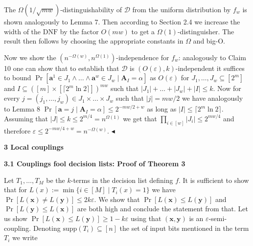 The $\Omega(1/\sqrt{mw})$-distinguishability of $\mathcal{D}$ from the uniform distribution by $f_{w}$ is
shown analogously to Lemma 7. Then according to Section 2.4
we increase the width of the $\mathrm{DNF}$ by the factor $O(mw)$ to get a $\Omega(1)$-distinguisher. The
result then follows by choosing the appropriate constants in $\Omega$ and big-O.\par




Now we show the $(n^{-\Omega(w)},n^{\Omega(1)})$-independence for $f_{w}$: analogously to
Claim 10 one can show that to establish that $\mathcal{D}$ is $(O(\varepsilon),k)$-independent it suffices to bound $\Pr[\bm{a}^{1}\in J_{1}\land\dots\land\bm{a}^{w}\in J_{w}\mid\bm{A}_{I}=\alpha]$ as $O(\varepsilon)$ for $J_{1},\dots,J_{w}\subseteq[2^{m}]$ and $I\subseteq([m]\times[\lceil 2^{m}\ln 2\rceil])^{mw}$ such that $|J_{1}|+\dots+|J_{w}|+|I|\leq k$. Now for every $j=(j_{1},\dots,j_{w})\in J_{1}\times\dots\times J_{w}$ such that $|j|=mw/2$ we have analogously to
Lemma 8 $\Pr[\bm{a}=j\mid\bm{A}_{I}=\alpha]\leq 2^{-mw/2+w}$ as long as $|I|\leq\lceil 2^{m}\ln 2\rceil$. Assuming that $|J|\leq k\leq 2^{m/4}=n^{\Omega(1)}$ we get that $\prod_{i\in[w]}|J_{i}|\leq 2^{mw/4}$ and therefore $\varepsilon\leq 2^{-mw/4+w}=n^{-\Omega(w)}$.
$\blacktriangleleft$\par







\par\medskip\noindent\textbf{
3 Local couplings}\par




\par\medskip\noindent\textbf{
3.1 Couplings fool decision lists: Proof of Theorem 3
}\par




Let $T_{1},\dots,T_{M}$ be the $k$-terms in the decision list defining $f$. It is sufficient to show that for $L(x):=\min\{i\in[M]\mid T_{i}(x)=1\}$ we have $\Pr[L(\bm{x})\neq L(\bm{y})]\leq 2k\varepsilon$.
We show that $\Pr[L(\bm{x})\leq L(\bm{y})]$ and $\Pr[L(\bm{y})\leq L(\bm{x})]$ are both high and conclude the statement from that. Let us show $\Pr[L(\bm{x})\leq L(\bm{y})]\geq 1-k\varepsilon$ using that $(\bm{x},\bm{y})$ is an $\varepsilon$-semi-coupling. Denoting $\mathrm{supp}(T_{i})\subseteq[n]$ the set of input bits mentioned in the term $T_{i}$ we write\par




